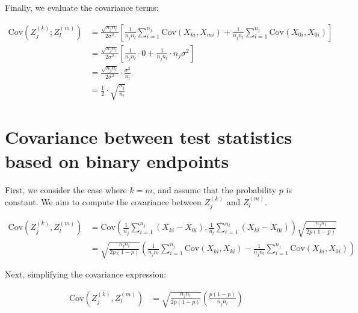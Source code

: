 \documentclass[11pt, a4paper]{article}\usepackage[]{graphicx}\usepackage[]{xcolor}
\begin{document}
Finally, we evaluate the covariance terms:

\begin{align*}
\text{Cov}\left(Z_j^{(k)}; Z_l^{(m)}\right)
& = \frac{\sqrt{n_j n_l}}{2 \sigma^2} \left[ \frac{1}{n_j n_l} \sum_{i=1}^{n_j} \text{Cov}\left(X_{ki}, X_{mi}\right) + \frac{1}{n_j n_l} \sum_{i=1}^{n_j} \text{Cov}\left(X_{0i}, X_{0i}\right) \right] \\
& = \frac{\sqrt{n_j n_l}}{2 \sigma^2} \left[ \frac{1}{n_j n_l} \cdot 0 + \frac{1}{n_j n_l} \cdot n_j \sigma^2 \right] \\
& = \frac{\sqrt{n_j n_l}}{2 \sigma^2} \cdot \frac{\sigma^2}{n_l} \\
& = \frac{1}{2} \cdot \sqrt{\frac{n_j}{n_l}}
\end{align*}



\section{Covariance between test statistics based on binary endpoints} \label{sec:app_derivations_binary}

First, we consider the case where \( k = m \), and assume that the probability \( p \) is constant. We aim to compute the covariance between \( Z_j^{(k)} \) and \( Z_l^{(m)} \).

\begin{align*}
\text{Cov}(Z_j^{(k)}, Z_l^{(m)})
&= \text{Cov}\left(\frac{1}{n_j} \sum_{i=1}^{n_j} (X_{ki} - X_{0i}), \frac{1}{n_l} \sum_{i=1}^{n_l} (X_{ki} - X_{0i})\right) \sqrt{\frac{n_j n_l}{2p(1-p)}} \\
&= \sqrt{\frac{n_j n_l}{2p(1-p)}} \left( \frac{1}{n_j n_l} \sum_{i=1}^{n_j} \text{Cov}(X_{ki}, X_{ki}) - \frac{1}{n_j n_l} \sum_{i=1}^{n_j} \text{Cov}(X_{ki}, X_{0i}) \right)
\end{align*}

Next, simplifying the covariance expression:

\begin{align*}
\text{Cov}(Z_j^{(k)}, Z_l^{(m)})
&= \sqrt{\frac{n_j n_l}{2p(1-p)}} \left( \frac{p(1-p)}{n_j n_l} \right) \\
\end{align*}
\end{document}
